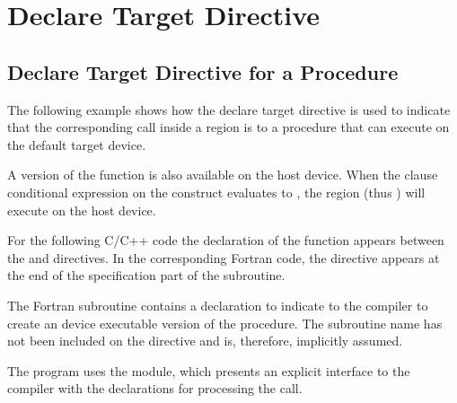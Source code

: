\section{Declare Target Directive}
\label{sec:declare_target}


\subsection{Declare Target Directive for a Procedure}

\label{subsec:declare_target_function}



The following example shows how the declare target directive 
is used to indicate that the corresponding call inside a  region 
is to a  procedure that can execute on the default target device.

A version of the function is also available on the host device. When the  
clause conditional expression on the  construct evaluates to , 
the  region (thus ) will execute on the host device.

For the following C/C++ code the declaration of the function  appears between the 
 and  directives.
In the corresponding Fortran code, the  directive appears at the
end of the specification part of the subroutine.


The Fortran  subroutine contains a  declaration
to indicate to the compiler to create an device executable version of the procedure. 
The subroutine name has not been included on the 
directive and is, therefore, implicitly assumed.

The program uses the  module, which presents an explicit interface to 
the compiler with the  declarations for processing
the  call.

